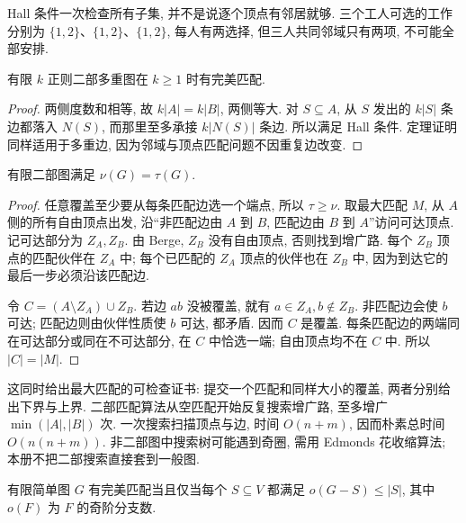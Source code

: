 Hall 条件一次检查所有子集, 并不是说逐个顶点有邻居就够. 三个工人可选的工作分别为 $\{1,2\}$、$\{1,2\}$、$\{1,2\}$, 每人有两选择, 但三人共同邻域只有两项, 不可能全部安排.
\begin{corollary}\label{cor:regularmatching}
有限 $k$ 正则二部多重图在 $k\ge1$ 时有完美匹配.
\end{corollary}
\begin{proof}
两侧度数和相等, 故 $k|A|=k|B|$, 两侧等大. 对 $S\subseteq A$, 从 $S$ 发出的 $k|S|$ 条边都落入 $N(S)$, 而那里至多承接 $k|N(S)|$ 条边. 所以满足 Hall 条件. 定理证明同样适用于多重边, 因为邻域与顶点匹配问题不因重复边改变.
\end{proof}
\begin{theorem}[Kőnig]\label{thm:konig}
有限二部图满足 $\nu(G)=\tau(G)$.
\end{theorem}
\begin{proof}
任意覆盖至少要从每条匹配边选一个端点, 所以 $\tau\ge\nu$. 取最大匹配 $M$, 从 $A$ 侧的所有自由顶点出发, 沿“非匹配边由 $A$ 到 $B$, 匹配边由 $B$ 到 $A$”访问可达顶点. 记可达部分为 $Z_A,Z_B$. 由 Berge, $Z_B$ 没有自由顶点, 否则找到增广路. 每个 $Z_B$ 顶点的匹配伙伴在 $Z_A$ 中; 每个已匹配的 $Z_A$ 顶点的伙伴也在 $Z_B$ 中, 因为到达它的最后一步必须沿该匹配边.

令 $C=(A\setminus Z_A)\cup Z_B$. 若边 $ab$ 没被覆盖, 就有 $a\in Z_A,b\notin Z_B$. 非匹配边会使 $b$ 可达; 匹配边则由伙伴性质使 $b$ 可达, 都矛盾. 因而 $C$ 是覆盖. 每条匹配边的两端同在可达部分或同在不可达部分, 在 $C$ 中恰选一端; 自由顶点均不在 $C$ 中. 所以 $|C|=|M|$.
\end{proof}
这同时给出最大匹配的可检查证书: 提交一个匹配和同样大小的覆盖, 两者分别给出下界与上界. 二部匹配算法从空匹配开始反复搜索增广路, 至多增广 $\min(|A|,|B|)$ 次. 一次搜索扫描顶点与边, 时间 $O(n+m)$, 因而朴素总时间 $O(n(n+m))$. 非二部图中搜索树可能遇到奇圈, 需用 Edmonds 花收缩算法; 本册不把二部搜索直接套到一般图.
\begin{theorem}[Tutte]\label{thm:tutte-matching}
有限简单图 $G$ 有完美匹配当且仅当每个 $S\subseteq V$ 都满足 $o(G-S)\le|S|$, 其中 $o(F)$ 为 $F$ 的奇阶分支数.
\end{theorem}
